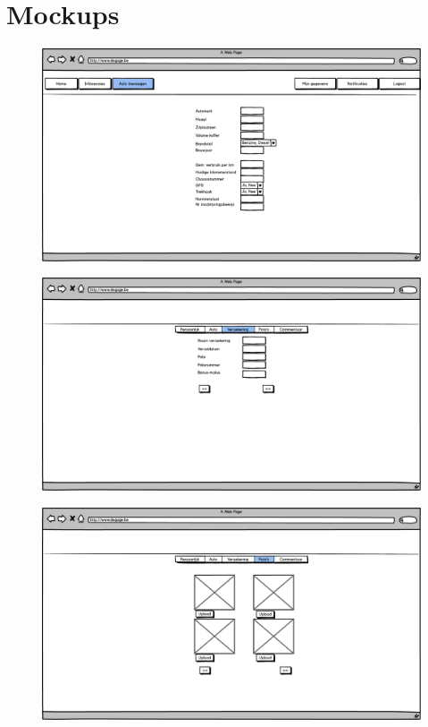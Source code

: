 \documentclass[11pt,a4paper,oneside]{article}
\begin{document}
\section{Mockups}
\begin{figure}[H]\includegraphics[width=\textwidth]{../../mockups/registratie_eigenaar_auto.png}\end{figure}
\begin{figure}[H]\includegraphics[width=\textwidth]{../../mockups/registratie_eigenaar_verzekering.png}\end{figure}
\begin{figure}[H]\includegraphics[width=\textwidth]{../../mockups/registratie_eigenaar_fotos.png}\end{figure}
\end{document}
